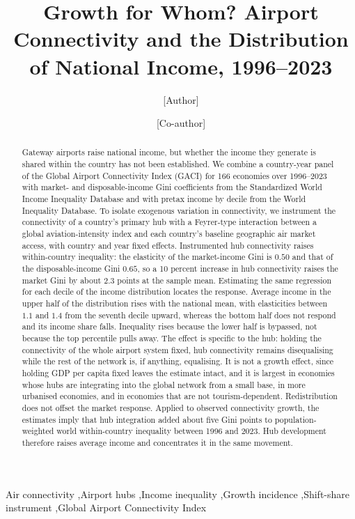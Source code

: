 \begin{frontmatter}

\title{Growth for Whom? Airport Connectivity and the Distribution of National Income, 1996--2023}

\author[a]{[Author]}
\ead{[email]}
\author[a]{[Co-author]}
\address[a]{[Affiliation]}

\begin{abstract}
Gateway airports raise national income, but whether the income they generate is shared within the country has not been established. We combine a country-year panel of the Global Airport Connectivity Index (GACI) for 166 economies over 1996--2023 with market- and disposable-income Gini coefficients from the Standardized World Income Inequality Database and with pretax income by decile from the World Inequality Database. To isolate exogenous variation in connectivity, we instrument the connectivity of a country's primary hub with a Feyrer-type interaction between a global aviation-intensity index and each country's baseline geographic air market access, with country and year fixed effects. Instrumented hub connectivity raises within-country inequality: the elasticity of the market-income Gini is $0.50$ and that of the disposable-income Gini $0.65$, so a 10 percent increase in hub connectivity raises the market Gini by about 2.3 points at the sample mean. Estimating the same regression for each decile of the income distribution locates the response. Average income in the upper half of the distribution rises with the national mean, with elasticities between $1.1$ and $1.4$ from the seventh decile upward, whereas the bottom half does not respond and its income share falls. Inequality rises because the lower half is bypassed, not because the top percentile pulls away. The effect is specific to the hub: holding the connectivity of the whole airport system fixed, hub connectivity remains disequalising while the rest of the network is, if anything, equalising. It is not a growth effect, since holding GDP per capita fixed leaves the estimate intact, and it is largest in economies whose hubs are integrating into the global network from a small base, in more urbanised economies, and in economies that are not tourism-dependent. Redistribution does not offset the market response. Applied to observed connectivity growth, the estimates imply that hub integration added about five Gini points to population-weighted world within-country inequality between 1996 and 2023. Hub development therefore raises average income and concentrates it in the same movement.
\end{abstract}

\begin{keyword}
Air connectivity \sep Airport hubs \sep Income inequality \sep Growth incidence \sep Shift-share instrument \sep Global Airport Connectivity Index
\end{keyword}

\end{frontmatter}


